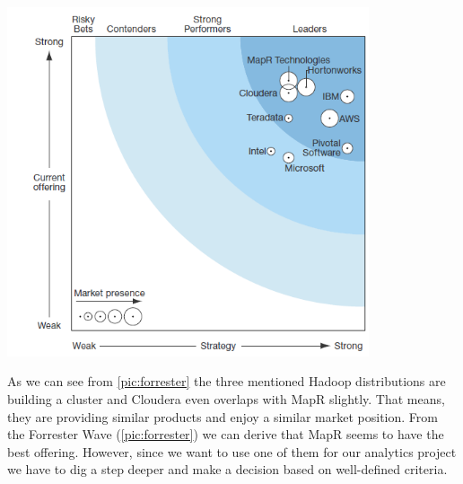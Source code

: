 \documentclass[12pt]{article}
\begin{document}
\begin{center}
\includegraphics[width=0.8\textwidth]{img/figure1}
\label{pic:forrester}
\end{center}
As we can see from 
\ref{pic:forrester} 
the three mentioned Hadoop distributions are building a cluster and Cloudera
even overlaps with MapR slightly. That means, they are providing similar products and enjoy a similar
market position. From the Forrester Wave (\ref{pic:forrester}) we can derive that MapR seems to have the best offering. However, since we want to use one of them for our analytics project we have to dig a step deeper and make a decision based on well-defined criteria.
\end{document}
